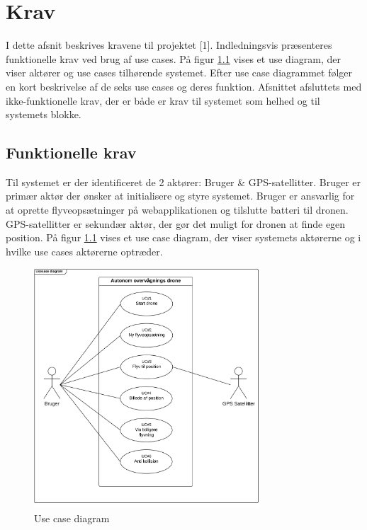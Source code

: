 \chapter{Krav}
\vspace{-0.5cm}
I dette afsnit beskrives kravene til projektet [1]. Indledningsvis præsenteres funktionelle krav  ved brug af use cases. På figur \ref{fig:useCaseDiagram} vises et use diagram, der viser aktører og use cases tilhørende systemet. Efter use case diagrammet følger en kort beskrivelse af de seks use cases og deres funktion. Afsnittet afsluttets med ikke-funktionelle krav, der er både er krav til systemet som helhed og til systemets blokke.
\vspace{-0.3cm}

\section{Funktionelle krav}
\vspace{-0.2cm}
Til systemet er der identificeret de 2 aktører: Bruger \& GPS-satellitter. Bruger er primær aktør der ønsker at initialisere og styre systemet. Bruger er ansvarlig for at oprette flyveopsætninger på webapplikationen og tilslutte batteri til dronen.
GPS-satellitter er sekundær aktør, der gør det muligt for dronen at finde egen position. 
På figur \ref{fig:useCaseDiagram} vises et use case diagram, der viser systemets aktørerne og i hvilke use cases aktørerne optræder. 
\begin{figure}[H]
	\centering
	\includegraphics[width=0.75\textwidth]{Billeder/Krav/Use_case_diagram}
	\vspace{-0.3cm}	
	\caption{Use case diagram}
	\label{fig:useCaseDiagram}
\end{figure}

